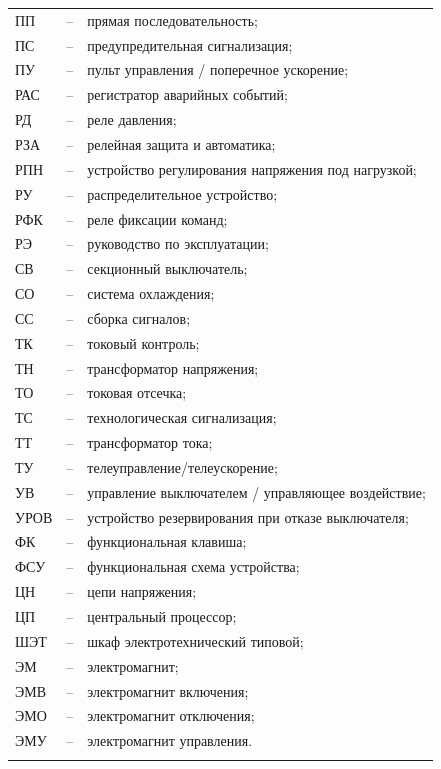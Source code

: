 \begin{longtable}{>{\raggedright\arraybackslash}m{2cm}>{\raggedright\arraybackslash}m{0.5cm}>{\raggedright\arraybackslash}m{20cm}}
ПП & -- & прямая последовательность; \\
ПС & -- & предупредительная сигнализация; \\
ПУ & -- & пульт управления / поперечное ускорение; \\
РАС & -- & регистратор аварийных событий; \\
РД & -- & реле давления; \\
РЗА & -- & релейная защита и автоматика; \\
РПН & -- & устройство регулирования напряжения под нагрузкой; \\
РУ & -- & распределительное устройство; \\
РФК & -- & реле фиксации команд; \\
РЭ & -- & руководство по эксплуатации; \\
СВ & -- & секционный выключатель; \\
СО & -- & система охлаждения; \\
СС & -- & сборка сигналов; \\
ТК & -- & токовый контроль; \\
ТН & -- & трансформатор напряжения; \\
ТО & -- & токовая отсечка; \\
ТС & -- & технологическая сигнализация; \\
ТТ & -- & трансформатор тока; \\
ТУ & -- & телеуправление/телеускорение; \\
УВ & -- & управление выключателем / управляющее воздействие; \\
УРОВ & -- & устройство резервирования при отказе выключателя; \\
ФК & -- & функциональная клавиша; \\
ФСУ & -- & функциональная схема устройства; \\
ЦН & -- & цепи напряжения; \\
ЦП & -- & центральный процессор; \\
ШЭТ & -- & шкаф электротехнический типовой; \\
ЭМ & -- & электромагнит; \\
ЭМВ & -- & электромагнит включения; \\
ЭМО & -- & электромагнит отключения; \\
ЭМУ & -- & электромагнит управления. \\
{\color{white}\fontsize{0.1pt}{0.1pt}\selectfont<endABBRS>}
\end{longtable}
